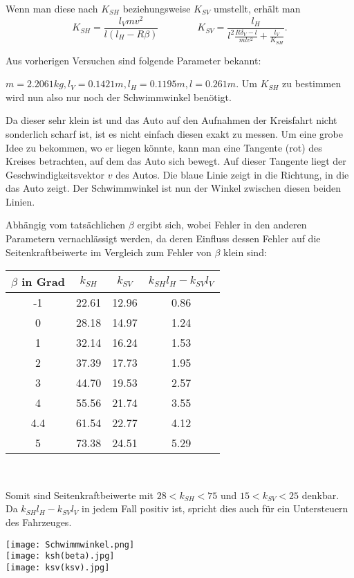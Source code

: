 Wenn man diese nach $K_{SH}$ beziehungsweise $K_{SV}$ umstellt, erhält man 
$$
K_{SH}=\frac{l_V mv^2}{l(l_H-R\beta)} \qquad \qquad K_{SV}=\frac{l_H}{l^2\frac{R\delta_V-l}{mlv^2}+\frac{l_V}{K_{SH}}}.
$$

Aus vorherigen Versuchen sind folgende Parameter bekannt:

$m=2.2061 kg,l_V=0.1421 m,l_H=0.1195 m,l=0.261 m$. Um $K_{SH}$ zu bestimmen wird nun also nur noch der Schwimmwinkel benötigt. 



Da dieser sehr klein ist und das Auto auf den Aufnahmen der Kreisfahrt nicht sonderlich scharf ist, ist es nicht einfach diesen exakt zu messen. Um eine grobe Idee zu bekommen, wo er liegen könnte, kann man eine Tangente (rot) des Kreises betrachten, auf dem das Auto sich bewegt. Auf dieser Tangente liegt der Geschwindigkeitsvektor $v$ des Autos. Die blaue Linie zeigt in die Richtung, in die das Auto zeigt. Der Schwimmwinkel ist nun der Winkel zwischen diesen beiden Linien. 

Abhängig vom tatsächlichen $\beta$ ergibt sich, wobei Fehler in den anderen Parametern vernachlässigt werden, da deren Einfluss dessen Fehler auf die Seitenkraftbeiwerte im Vergleich zum Fehler von $\beta$ klein sind:\\
\begin{center}
\begin{tabular}{|c|c|c|c|}
\hline
$\beta$ in Grad & $k_{SH}$& $k_{SV}$&$k_{SH}l_H-k_{SV}l_V$ \\\hline

-1  & 22.61 & 12.96&0.86\\\hline
0  & 28.18 & 14.97&1.24\\\hline
1  & 32.14 & 16.24&1.53\\\hline
2  & 37.39 & 17.73&1.95\\\hline
3  & 44.70 & 19.53&2.57\\\hline
4  & 55.56 & 21.74&3.55\\\hline
4.4  & 61.54 & 22.77&4.12\\\hline
5  & 73.38 & 24.51&5.29\\\hline

\end{tabular}\\
\end{center}
Somit sind Seitenkraftbeiwerte mit $28<k_{SH}<75$ und $15<k_{SV}<25$ denkbar. Da $k_{SH}l_H-k_{SV}l_V$ in jedem Fall positiv ist, spricht dies auch für ein Untersteuern des Fahrzeuges.
\begin{center}
\texttt{[image: Schwimmwinkel.png]}\\

\texttt{[image: ksh(beta).jpg]}\\

\texttt{[image: ksv(ksv).jpg]}
\end{center}
